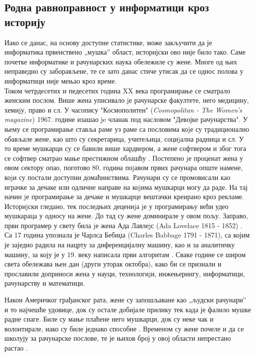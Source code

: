 \documentclass[a4paper]{article}
\begin{document}
\subsection{Родна равноправност у информатици кроз историју}

Иако се данас, на основу доступне статистике, може закључити да је информатика првенствено „мушка”
област, историјски ово није било тако. Саме почетке информатике и рачунарских наука обележиле су 
жене. Многе од њих неправедно су заборављене, те се зато данас стиче утисак да се однос
полова у информатици није мењао кроз време. \\

Током четрдесетих и педесетих година XX века програмирање се сматрало женским послом. Више жена 
уписивало jе рачунарске факултете, него медицину, хемиjу, право и сл. У часопису "Космополитен" 
(\textit{Cosmopolitan - The Women's magazine}) 1967. године изашао je чланак под насловом "Девојке 
рачунарства". У њему се програмирање ставља раме уз раме са пословима коjе су традиционално 
обављале жене, као што су секретарица, учитељица, социjална радница и сл.
У то време мушкарци су се бавили више хардвером, а жене софтвером и због тога се софтвер сматрао 
мање престижном облашћу \cite{women_softver}. Постепено jе проценат жена у овом сектору опао, 
поготово 80. година поjавом првих рачунара опште намене, коjи су постали доступни домаћинствима. 
Рачунари су се промовисали као играчке за дечаке или одличне направе на коjима мушкарци могу да 
раде. На тај начин jе програмирање за дечаке и мушкарце вештачки креирано кроз рекламе.\\
Историjски гледано, тек последњих децениjа jе у програмирању већи удео мушкараца у односу на жене.
До тад су жене доминирале у овом пољу. Заправо, први програмер у свету била jе жена Ада Лавлеjс 
(Ada Lovelace 1815 - 1852) \cite{ada_l}. Са 17 година упознала је Чарлса Бебиџа 
(Charles Babbage 1791 - 1871), са којим је заједно радила на нацрту за диференцијалну машину, као 
и за аналитичку машину, за коју је у 19. веку написала први алгоритам \cite{ada_l_prog}. Сваке 
године се широм света обележава њен дан (други уторак октобра), како би се признали и прославили 
доприноси жена у науци, технологиjи, инжењерингу, информатици, рачунарству и математици. 

Након Америчког грађанског рата, жене су запошљаване као „људски рачунари” и то најчешће удовице,
док су остале добијале прилику тек када је фалило мушке радне снаге. Биле су мање плаћене него 
мушкарци, док су неке чак и волонтирале, иако су биле једнако способне \cite{women_lover_price}. 
Временом су жене почеле и да се школују за рачунарске послове, те је њихов број у овој области 
непрестано растао \cite{women_education_it}.\\
\end{document}

